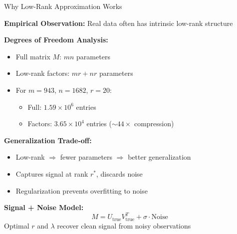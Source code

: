 \documentclass[aspectratio=169,usenames,dvipsnames]{beamer}
\begin{document}
\begin{frame}{Why Low-Rank Approximation Works}

\textbf{Empirical Observation:} Real data often has intrinsic low-rank structure

\vspace{0.3cm}

\textbf{Degrees of Freedom Analysis:}
\begin{itemize}
  \item Full matrix $M$: $mn$ parameters
  \item Low-rank factors: $mr + nr$ parameters
  \item For $m = 943$, $n = 1682$, $r = 20$:
    \begin{itemize}
      \item Full: $1.59 \times 10^6$ entries
      \item Factors: $3.65 \times 10^4$ entries ($\sim 44\times$ compression)
    \end{itemize}
\end{itemize}

\vspace{0.3cm}

\textbf{Generalization Trade-off:}
\begin{itemize}
  \item Low-rank $\Rightarrow$ fewer parameters $\Rightarrow$ better generalization
  \item Captures signal at rank $r^*$, discards noise
  \item Regularization prevents overfitting to noise
\end{itemize}

\vspace{0.3cm}

\textbf{Signal + Noise Model:}
\[
M = U_{\text{true}} V_{\text{true}}^T + \sigma \cdot \text{Noise}
\]
Optimal $r$ and $\lambda$ recover clean signal from noisy observations

\end{frame}
\end{document}
